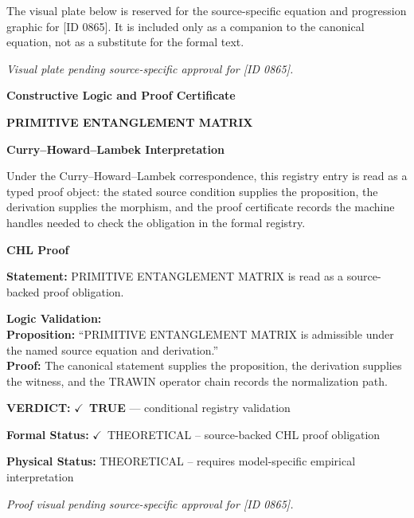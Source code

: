 \begingroup\footnotesize\sloppy
The visual plate below is reserved for the source-specific equation and progression graphic for [ID 0865]. It is included only as a companion to the canonical equation, not as a substitute for the formal text.
\par\endgroup
\begingroup\footnotesize\itshape
Visual plate pending source-specific approval for [ID 0865].
\par\endgroup

\clearpage
\begingroup\tzpsupportsetup
\noindent\textbf{\fontsize{10.8pt}{12.8pt}\selectfont [ID 0865] Constructive Logic and Proof Certificate}\par
\noindent\textbf{\fontsize{10pt}{12pt}\selectfont PRIMITIVE ENTANGLEMENT MATRIX}\par
\vspace{0.45em}
\begingroup
\footnotesize
\setlength{\parskip}{0.22em}
\setlength{\parindent}{0pt}
\noindent\textbf{Curry--Howard--Lambek Interpretation}\par
Under the Curry--Howard--Lambek correspondence, this registry entry is read as a typed proof
object: the stated source condition supplies the proposition, the derivation supplies the
morphism, and the proof certificate records the machine handles needed to check the obligation
in the formal registry.

\vspace{0.45em}
\noindent\textbf{CHL Proof}\par
\textbf{Statement:} PRIMITIVE ENTANGLEMENT MATRIX is read as a source-backed proof obligation.

\textbf{Logic Validation:}\\
\textbf{Proposition:} ``PRIMITIVE ENTANGLEMENT MATRIX is admissible under the named source equation and derivation.''\\
\textbf{Proof:} The canonical statement supplies the proposition, the derivation supplies the witness, and the TRAWIN operator chain records the normalization path.

\textbf{VERDICT:} \ensuremath{\checkmark}\ \textbf{TRUE} --- conditional registry validation

\textbf{Formal Status:} \ensuremath{\checkmark}\ THEORETICAL -- source-backed CHL proof obligation

\textbf{Physical Status:} THEORETICAL -- requires model-specific empirical interpretation
\par\vspace{0.45em}
\par
\vfill
\begingroup\footnotesize\itshape
Proof visual pending source-specific approval for [ID 0865].
\par\endgroup
\vfill
\endgroup
\endgroup
